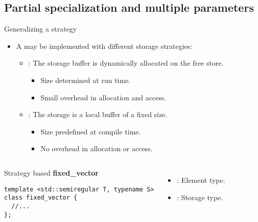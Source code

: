 \subsection{Partial specialization and multiple parameters}

\begin{frame}[t,fragile]{Generalizing a strategy}
\begin{itemize}
  \item A  may be implemented with different 
        storage strategies:
    \begin{itemize}
      \item {}: The storage buffer is dynamically allocated
            on the free store.
        \begin{itemize}
          \item Size determined at run time.
          \item Small overhead in allocation and access.
        \end{itemize}

      \item {}: The storage is a local buffer of a fixed size.
        \begin{itemize}
          \item Size predefined at compile time.
          \item No overhead in allocation or access.
        \end{itemize}
    \end{itemize}
\end{itemize}

\begin{columns}

\begin{block}{Strategy based \textbf{fixed\_vector}}
\begin{lstlisting}
template <std::semiregular T, typename S>
class fixed_vector {
  //...
};
\end{lstlisting}
\end{block}

\begin{itemize}
  \item {}: Element type.
  \item {}: Storage type.
\end{itemize}

\end{columns}

\end{frame}

